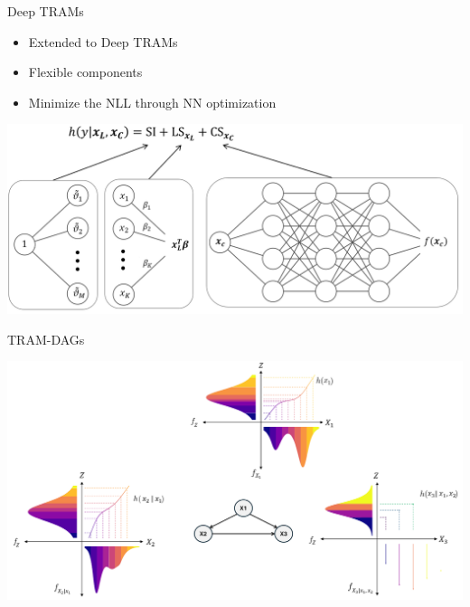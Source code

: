 \documentclass[onlytextwidth,english]{beamer}\usepackage[]{graphicx}\usepackage[]{xcolor}
\begin{document}
\begin{frame}{Deep TRAMs}
  \begin{itemize}
    \item Extended to Deep TRAMs \citep{sick2020}
    \item Flexible components
    \item Minimize the NLL through NN optimization
  \end{itemize}

  \vfill
  \centering
  \includegraphics[width=0.9\linewidth]{img/deep_TRAM.png}
\end{frame}





\begin{frame}{TRAM-DAGs}

  \centering
  \includegraphics[width=1\linewidth]{img/TRAM_DAG.png}
\end{frame}
\end{document}
